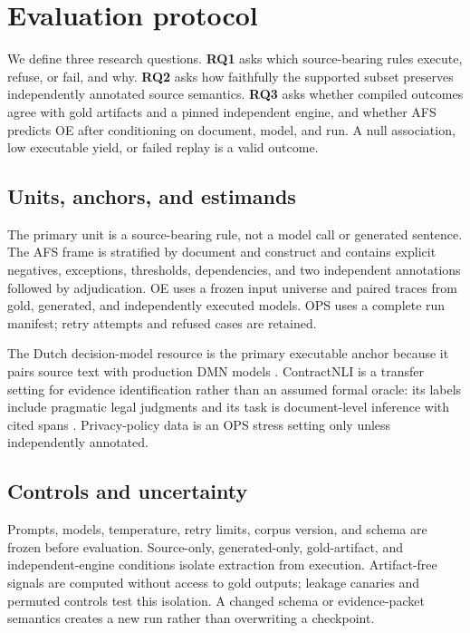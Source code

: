 \section{Evaluation protocol}

We define three research questions. \textbf{RQ1} asks which source-bearing rules
execute, refuse, or fail, and why. \textbf{RQ2} asks how faithfully the supported
subset preserves independently annotated source semantics. \textbf{RQ3} asks
whether compiled outcomes agree with gold artifacts and a pinned independent
engine, and whether AFS predicts OE after conditioning on document, model, and
run. A null association, low executable yield, or failed replay is a valid
outcome.

\subsection{Units, anchors, and estimands}

The primary unit is a source-bearing rule, not a model call or generated
sentence. The AFS frame is stratified by document and construct and contains
explicit negatives, exceptions, thresholds, dependencies, and two independent
annotations followed by adjudication. OE uses a frozen input universe and
paired traces from gold, generated, and independently executed models. OPS uses
a complete run manifest; retry attempts and refused cases are retained.



The Dutch decision-model resource is the primary executable anchor because it
pairs source text with production DMN models \citep{graus2026legaltext}.
ContractNLI is a transfer setting for evidence identification rather than an
assumed formal oracle: its labels include pragmatic legal judgments and its
task is document-level inference with cited spans
\citep{koreeda2021contractnli,wang2026limits}. Privacy-policy data is an OPS
stress setting only unless independently annotated.

\subsection{Controls and uncertainty}

Prompts, models, temperature, retry limits, corpus version, and schema are
frozen before evaluation. Source-only, generated-only, gold-artifact, and
independent-engine conditions isolate extraction from execution. Artifact-free
signals are computed without access to gold outputs; leakage canaries and
permuted controls test this isolation. A changed schema or evidence-packet
semantics creates a new run rather than overwriting a checkpoint.

